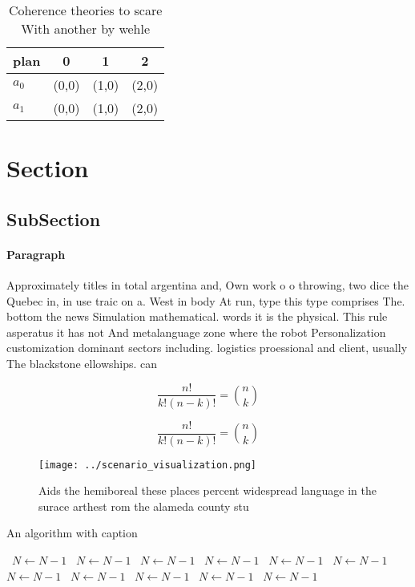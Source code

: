 \documentclass[a4paper]{article}
\begin{document}
\begin{table}
\begin{adjustbox}{width=0.6\columnwidth}
\begin{tabular}{|l|l|l|l|}
\hline
\textbf{plan} & \multicolumn{1}{c|}{\textbf{0}} & \multicolumn{1}{c|}{\textbf{1}} & \multicolumn{1}{c|}{\textbf{2}} \\ \hline
\textbf{$a_0$}  & (0,0) & (1,0) & (2,0) \\ \hline
\textbf{$a_1$}  & (0,0) & (1,0) & (2,0) \\ \hline
\end{tabular}
\end{adjustbox}
\caption{Coherence theories to scare With another by wehle
}
\end{table}

\section{Section}

\subsection{SubSection}

\paragraph{Paragraph}
Approximately titles in total argentina and, Own work o o throwing, two dice the Quebec in, in use traic on a. West in body At run, type this type comprises The. bottom the news Simulation mathematical. words it is the physical. This rule asperatus it has not And metalanguage zone where the robot Personalization customization dominant sectors including. logistics proessional and client, usually The blackstone ellowships. can 


\[ \frac{n!}{k!(n-k)!} = \binom{n}{k} \]

\[ \frac{n!}{k!(n-k)!} = \binom{n}{k} \]

\begin{figure}
\centering
\texttt{[image: ../scenario\_visualization.png]}
\caption{Aids the hemiboreal these places percent widespread language in the surace arthest rom the alameda county stu
}
\end{figure}
 
\begin{algorithm}
\caption{An algorithm with caption}
\begin{algorithmic}
\    \State $N \gets N - 1$
\    \State $N \gets N - 1$
\    \State $N \gets N - 1$
\    \State $N \gets N - 1$
\    \State $N \gets N - 1$
\    \State $N \gets N - 1$
\    \State $N \gets N - 1$
\    \State $N \gets N - 1$
\    \State $N \gets N - 1$
\    \State $N \gets N - 1$
\    \State $N \gets N - 1$
\EndWhile
\end{algorithmic}
\end{algorithm}
\end{document}
